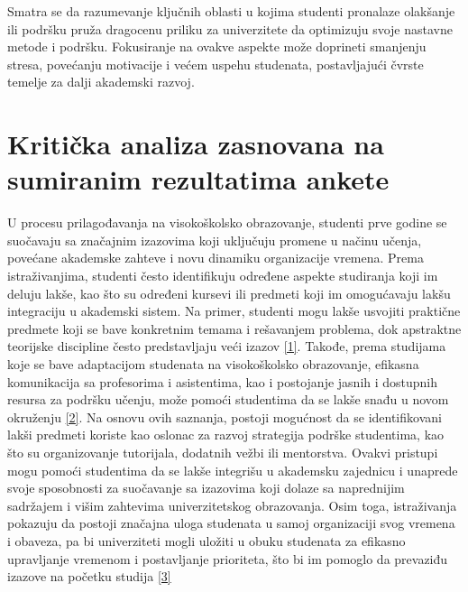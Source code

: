 \documentclass[a4paper]{article}
\begin{document}
Smatra se da razumevanje ključnih oblasti u kojima studenti pronalaze olakšanje ili podršku pruža dragocenu priliku za univerzitete da optimizuju svoje nastavne metode i podršku. Fokusiranje na ovakve aspekte može doprineti smanjenju stresa, povećanju motivacije i većem uspehu studenata, postavljajući čvrste temelje za dalji akademski razvoj.\\



\section{\textbf{Kritička analiza zasnovana na sumiranim rezultatima ankete}
}
\label{sec:naslov1}

U procesu prilagođavanja na visokoškolsko obrazovanje, studenti prve godine se suočavaju sa značajnim izazovima koji uključuju promene u načinu učenja, povećane akademske zahteve i novu dinamiku organizacije vremena. Prema istraživanjima, studenti često identifikuju određene aspekte studiranja koji im deluju lakše, kao što su određeni kursevi ili predmeti koji im omogućavaju lakšu integraciju u akademski sistem. Na primer, studenti mogu lakše usvojiti praktične predmete koji se bave konkretnim temama i rešavanjem problema, dok apstraktne teorijske discipline često predstavljaju veći izazov \href{ https://doi.org/10.3102/00346543075001027}{[1]}. Takođe, prema studijama koje se bave adaptacijom studenata na visokoškolsko obrazovanje, efikasna komunikacija sa profesorima i asistentima, kao i postojanje jasnih i dostupnih resursa za podršku učenju, može pomoći studentima da se lakše snađu u novom okruženju  \href{https://archive.org/details/leavingcollegere0002tint/page/n5/mode/2up}{[2]}. Na osnovu ovih saznanja, postoji mogućnost da se identifikovani lakši predmeti koriste kao oslonac za razvoj strategija podrške studentima, kao što su organizovanje tutorijala, dodatnih vežbi ili mentorstva. Ovakvi pristupi mogu pomoći studentima da se lakše integrišu u akademsku zajednicu i unaprede svoje sposobnosti za suočavanje sa izazovima koji dolaze sa naprednijim sadržajem i višim zahtevima univerzitetskog obrazovanja. Osim toga, istraživanja pokazuju da postoji značajna uloga studenata u samoj organizaciji svog vremena i obaveza, pa bi univerziteti mogli uložiti u obuku studenata za efikasno upravljanje vremenom i postavljanje prioriteta, što bi im pomoglo da prevaziđu izazove na početku studija \href{https://doi.org/10.24926/jcotr.v29i2.4869}{[3]} \\
\end{document}
